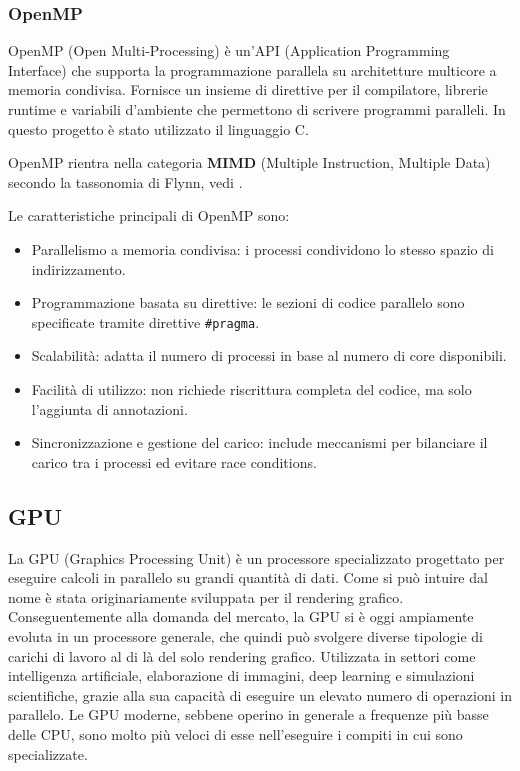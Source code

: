 \documentclass[12pt,a4paper]{report}
\begin{document}
\subsubsection{OpenMP}

OpenMP (Open Multi-Processing) è un'API (Application Programming Interface) che supporta la programmazione parallela su
architetture multicore a memoria condivisa.
Fornisce un insieme di direttive per il compilatore, librerie runtime e variabili d'ambiente che permettono di scrivere programmi
paralleli.
In questo progetto è stato utilizzato il linguaggio C.

OpenMP rientra nella categoria \textbf{MIMD} (Multiple Instruction, Multiple Data) secondo la tassonomia di Flynn, vedi
\cite{Flynn1966}.

Le caratteristiche principali di OpenMP sono:
\begin{itemize}
  \item Parallelismo a memoria condivisa: i processi condividono lo stesso spazio di indirizzamento.
  \item Programmazione basata su direttive: le sezioni di codice parallelo sono specificate tramite direttive \lstinline|#pragma|.
  \item Scalabilità: adatta il numero di processi in base al numero di core disponibili.
  \item Facilità di utilizzo: non richiede riscrittura completa del codice, ma solo l'aggiunta di annotazioni.
  \item Sincronizzazione e gestione del carico: include meccanismi per bilanciare il carico tra i processi ed evitare race
        conditions.
\end{itemize}

\subsection{GPU}

La GPU (Graphics Processing Unit) è un processore specializzato progettato per eseguire calcoli in parallelo su grandi quantità di
dati.
Come si può intuire dal nome è stata originariamente sviluppata per il rendering grafico.
Conseguentemente alla domanda del mercato, la GPU si è oggi ampiamente evoluta in un processore generale, che quindi può svolgere
diverse tipologie di carichi di lavoro al di là del solo rendering grafico.
Utilizzata in settori come intelligenza artificiale, elaborazione di immagini, deep learning e simulazioni scientifiche, grazie
alla sua capacità di eseguire un elevato numero di operazioni in parallelo.
Le GPU moderne, sebbene operino in generale a frequenze più basse delle CPU, sono molto più veloci di esse nell'eseguire i compiti
in cui sono specializzate.
\end{document}

